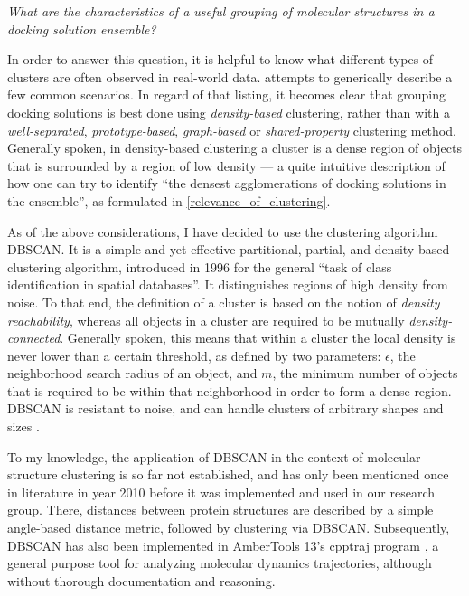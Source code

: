 \begin{adjustwidth}{1.5cm}{1.5cm}
\textit{What are the characteristics of a useful grouping of
molecular structures in a docking solution ensemble?}
\end{adjustwidth}

In order to answer this question, it is helpful to know what different types of
clusters are often observed in real-world data. \cite{tan_data_mining} attempts
to generically describe a few common scenarios. In regard of that listing, it
becomes clear that grouping docking solutions is best done using
\textit{density-based} clustering, rather than with a \textit{well-separated},
\textit{prototype-based}, \textit{graph-based} or \textit{shared-property}
clustering method. Generally spoken, in density-based clustering a cluster is a
dense region of objects that is surrounded by a region of low density --- a
quite intuitive description of how one can try to identify \enquote{the densest
agglomerations of docking solutions in the ensemble}, as formulated in
\cref{relevance_of_clustering}.

As of the above considerations, I have decided to use the clustering algorithm
DBSCAN. It is a simple and yet effective partitional, partial, and density-based
clustering algorithm, introduced in 1996 \cite{dbscan_ester1996} for the general
\enquote{task of class identification in spatial databases}. It distinguishes
regions of high density from noise. To that end, the definition of a cluster is
based on the notion of \textit{density reachability}, whereas all objects in a
cluster are required to be mutually \textit{density-connected}. Generally
spoken, this means that within a cluster the local density is never lower than a
certain threshold, as defined by two parameters: $\epsilon$, the neighborhood
search radius of an object, and $m$, the minimum number of objects that is
required to be within that neighborhood in order to form a dense region. DBSCAN
is resistant to noise, and can handle clusters of arbitrary shapes and sizes
\cite{dbscan_ester1996}.

To my knowledge, the application of DBSCAN in the context of molecular
structure clustering is so far not established, and has only been mentioned once
in literature in year 2010 \cite{dbscan_usage_proteinstructures_2010} before it
was implemented and used in our research group. There, distances between protein
structures are described by a simple angle-based distance metric, followed by
clustering via DBSCAN. Subsequently, DBSCAN has also been implemented in
AmberTools 13's cpptraj program \cite{cpptraj_2013}, a general purpose tool for
analyzing molecular dynamics trajectories, although without thorough
documentation and reasoning.


